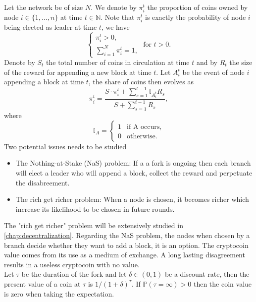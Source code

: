 \noindent Let the network be of size $N$. We denote by $\pi_i^t$ the proportion of coins owned by node $i\in\{1,\ldots,n\}$ at time $t\in\mathbb{N}$. Note that $\pi_i^t$ is exactly the probability of node $i$ being elected as leader at time $t$, we have
$$
\begin{cases}
\pi_i^t>0,\\
\sum_{i=1}^N\pi_i^t = 1,
\end{cases}
\text{ for } t>0.
$$
Denote by $S_t$ the total number of coins in circulation at time $t$ and by $R_t$ the size of the reward for appending a new block at time $t$. Let $A_i^t$ be the event of node $i$ appending a block at time $t$, the share of coins then evolves as
$$
\pi_i^t = \frac{S\cdot \pi_i^t + \sum_{s=1}^{t-1}\mathbb{I}_{A_i^t}R_s}{S+\sum_{s=1}^{t-1}R_s},
$$
where 
$$
\mathbb{I}_{A} = \begin{cases}1& \text{if A occurs},\\
0&\text{otherwise}.
\end{cases}
$$
Two potential issues needs to be studied
\begin{itemize}
    \item The Nothing-at-Stake (NaS) problem: If a a fork is ongoing then each branch will elect a leader who will append a block, collect the reward and perpetuate the disabreement.
    \item The rich get richer problem: When a node is chosen, it becomes richer which increase its likelihood to be chosen in future rounds.
\end{itemize}
The "rich get richer" problem will be extensively studied in \cref{chap:decentralization}. Regarding the NaS problem, the nodes when chosen by a branch decide whether they want to add a block, it is an option. The cryptocoin value comes from its use as a medium of exchange. A long lasting disagreement results in a useless cryptocoin with no value.\\

\noindent Let $\tau$ be the duration of the fork and let $\delta\in(0,1)$ be a discount rate, then the present value of a coin at $\tau$ is $1/(1+\delta)^\tau$. If $\mathbb{P}(\tau=\infty)>0$ then the coin value is zero when taking the expectation.\\

